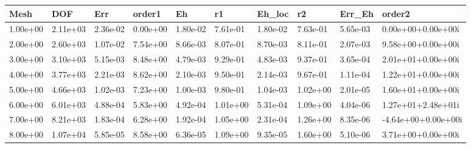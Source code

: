 \begin{tabular}{llllllllll}
Mesh & DOF & Err & order1 & Eh & r1 & Eh_loc & r2 & Err_Eh & order2 \\ 
\hline 
1.00e+00 & 2.11e+03 & 2.36e-02 & 0.00e+00 & 1.80e-02 & 7.61e-01 & 1.80e-02 & 7.63e-01 & 5.65e-03 &  0.00e+00+0.00e+00i \\ 
2.00e+00 & 2.60e+03 & 1.07e-02 & 7.54e+00 & 8.66e-03 & 8.07e-01 & 8.70e-03 & 8.11e-01 & 2.07e-03 &  9.58e+00+0.00e+00i \\ 
3.00e+00 & 3.10e+03 & 5.15e-03 & 8.48e+00 & 4.79e-03 & 9.29e-01 & 4.83e-03 & 9.37e-01 & 3.65e-04 &  2.01e+01+0.00e+00i \\ 
4.00e+00 & 3.77e+03 & 2.21e-03 & 8.62e+00 & 2.10e-03 & 9.50e-01 & 2.14e-03 & 9.67e-01 & 1.11e-04 &  1.22e+01+0.00e+00i \\ 
5.00e+00 & 4.66e+03 & 1.02e-03 & 7.23e+00 & 1.00e-03 & 9.80e-01 & 1.04e-03 & 1.02e+00 & 2.01e-05 &  1.60e+01+0.00e+00i \\ 
6.00e+00 & 6.01e+03 & 4.88e-04 & 5.83e+00 & 4.92e-04 & 1.01e+00 & 5.31e-04 & 1.09e+00 & 4.04e-06 &  1.27e+01+2.48e+01i \\ 
7.00e+00 & 8.21e+03 & 1.83e-04 & 6.28e+00 & 1.92e-04 & 1.05e+00 & 2.31e-04 & 1.26e+00 & 8.35e-06 & -4.64e+00+0.00e+00i \\ 
8.00e+00 & 1.07e+04 & 5.85e-05 & 8.58e+00 & 6.36e-05 & 1.09e+00 & 9.35e-05 & 1.60e+00 & 5.10e-06 &  3.71e+00+0.00e+00i \\ 
\hline 
\end{tabular}